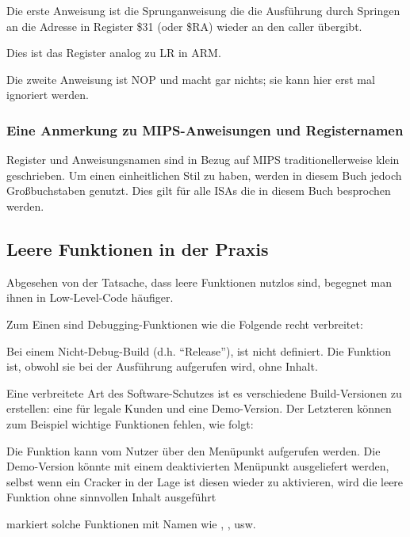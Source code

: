 Die erste Anweisung ist die Sprunganweisung die die Ausführung durch Springen an die Adresse
in Register \$31 (oder \$RA) wieder an den \gls{caller} übergibt.

Dies ist das Register analog zu \ac{LR} in ARM.

Die zweite Anweisung ist \ac{NOP} und macht gar nichts; sie kann hier erst mal ignoriert werden.

\subsubsection{Eine Anmerkung zu MIPS-Anweisungen und Registernamen}

Register und Anweisungsnamen sind in Bezug auf MIPS traditionellerweise klein geschrieben.
Um einen einheitlichen Stil zu haben, werden in diesem Buch jedoch Großbuchstaben genutzt.
Dies gilt für alle \ac{ISA}s die in diesem Buch besprochen werden.

\subsection{Leere Funktionen in der Praxis}

Abgesehen von der Tatsache, dass leere Funktionen nutzlos sind, begegnet man ihnen
in Low-Level-Code häufiger.

Zum Einen sind Debugging-Funktionen wie die Folgende recht verbreitet:



Bei einem Nicht-Debug-Build (d.h. ``Release''), ist  nicht definiert.
Die Funktion  ist, obwohl sie bei der Ausführung aufgerufen wird, ohne Inhalt.

Eine verbreitete Art des Software-Schutzes ist es verschiedene Build-Versionen zu erstellen:
eine für legale Kunden und eine Demo-Version. Der Letzteren können zum Beispiel wichtige
Funktionen fehlen, wie folgt:



Die Funktion kann vom Nutzer über den Menüpunkt  aufgerufen werden.
Die Demo-Version könnte mit einem deaktivierten Menüpunkt ausgeliefert werden, selbst wenn ein
Cracker in der Lage ist diesen wieder zu aktivieren, wird die leere Funktion ohne sinnvollen
Inhalt ausgeführt

\IDA markiert solche Funktionen mit Namen wie , , usw.
